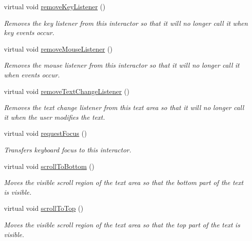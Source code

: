 \begin{DoxyCompactItemize}
virtual void \mbox{\hyperlink{classsgl_1_1GInteractor_a43095f41cab3be732b49f29970484b05}{remove\+Key\+Listener}} ()
\begin{DoxyCompactList}\small\item\em Removes the key listener from this interactor so that it will no longer call it when key events occur. \end{DoxyCompactList}\item 
virtual void \mbox{\hyperlink{classsgl_1_1GInteractor_aff47f71ce47e688a07c9d38dc92fcc11}{remove\+Mouse\+Listener}} ()
\begin{DoxyCompactList}\small\item\em Removes the mouse listener from this interactor so that it will no longer call it when events occur. \end{DoxyCompactList}\item 
virtual void \mbox{\hyperlink{classsgl_1_1GTextArea_a69c940b99d01eb7c353763ce4b0942a4}{remove\+Text\+Change\+Listener}} ()
\begin{DoxyCompactList}\small\item\em Removes the text change listener from this text area so that it will no longer call it when the user modifies the text. \end{DoxyCompactList}\item 
virtual void \mbox{\hyperlink{classsgl_1_1GInteractor_a519fb2ac767f8b2febbb50b898b8c8cb}{request\+Focus}} ()
\begin{DoxyCompactList}\small\item\em Transfers keyboard focus to this interactor. \end{DoxyCompactList}\item 
virtual void \mbox{\hyperlink{classsgl_1_1GTextArea_ad4c9b6140b529865a6cdeed37a339237}{scroll\+To\+Bottom}} ()
\begin{DoxyCompactList}\small\item\em Moves the visible scroll region of the text area so that the bottom part of the text is visible. \end{DoxyCompactList}\item 
virtual void \mbox{\hyperlink{classsgl_1_1GTextArea_a9eacfcf7c186936ed957dd1c8a9c6b64}{scroll\+To\+Top}} ()
\begin{DoxyCompactList}\small\item\em Moves the visible scroll region of the text area so that the top part of the text is visible. \end{DoxyCompactList}\item 

\end{DoxyCompactItemize}
